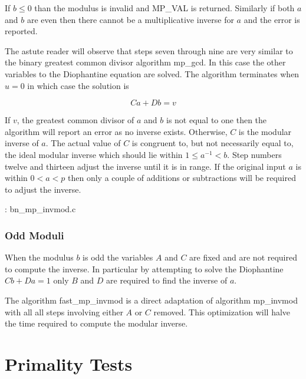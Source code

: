 \documentclass[b5paper]{book}
\begin{document}
If $b \le 0$ than the modulus is invalid and MP\_VAL is returned.  Similarly if both $a$ and $b$ are even then there cannot be a multiplicative
inverse for $a$ and the error is reported.  

The astute reader will observe that steps seven through nine are very similar to the binary greatest common divisor algorithm mp\_gcd.  In this case
the other variables to the Diophantine equation are solved.  The algorithm terminates when $u = 0$ in which case the solution is

\begin{equation}
Ca + Db = v
\end{equation}

If $v$, the greatest common divisor of $a$ and $b$ is not equal to one then the algorithm will report an error as no inverse exists.  Otherwise, $C$
is the modular inverse of $a$.  The actual value of $C$ is congruent to, but not necessarily equal to, the ideal modular inverse which should lie 
within $1 \le a^{-1} < b$.  Step numbers twelve and thirteen adjust the inverse until it is in range.  If the original input $a$ is within $0 < a < p$ 
then only a couple of additions or subtractions will be required to adjust the inverse.

\vspace{+3mm}\begin{small}
\hspace{-5.1mm}{\bf File}: bn\_mp\_invmod.c
\vspace{-3mm}
\begin{alltt}
\end{alltt}
\end{small}

\subsubsection{Odd Moduli}

When the modulus $b$ is odd the variables $A$ and $C$ are fixed and are not required to compute the inverse.  In particular by attempting to solve
the Diophantine $Cb + Da = 1$ only $B$ and $D$ are required to find the inverse of $a$.  

The algorithm fast\_mp\_invmod is a direct adaptation of algorithm mp\_invmod with all all steps involving either $A$ or $C$ removed.  This 
optimization will halve the time required to compute the modular inverse.

\section{Primality Tests}
\end{document}
